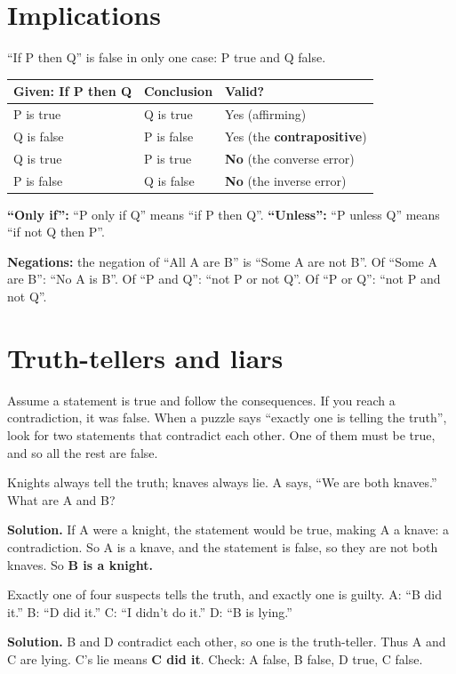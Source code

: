\documentclass[11pt,a4paper,openany]{report}
\begin{document}
\section{Implications}
``If P then Q'' is false in only one case: P true and Q false.
\begin{center}\small
\begin{tabular}{lll}
\toprule
Given: If P then Q & Conclusion & Valid?\\\midrule
P is true & Q is true & Yes (affirming)\\
Q is false & P is false & Yes (the \textbf{contrapositive})\\
Q is true & P is true & \textbf{No} (the converse error)\\
P is false & Q is false & \textbf{No} (the inverse error)\\
\bottomrule
\end{tabular}
\end{center}
\textbf{``Only if'':} ``P only if Q'' means ``if P then Q''. \textbf{``Unless'':} ``P unless Q'' means ``if not Q then P''.

\textbf{Negations:} the negation of ``All A are B'' is ``Some A are not B''. Of ``Some A are B'': ``No A is B''. Of ``P and Q'': ``not P or not Q''. Of ``P or Q'': ``not P and not Q''.

\section{Truth-tellers and liars}
\begin{idea}[Method]
Assume a statement is true and follow the consequences. If you reach a contradiction, it was false. When a puzzle says ``exactly one is telling the truth'', look for two statements that contradict each other. One of them must be true, and so all the rest are false.
\end{idea}

\begin{example}
Knights always tell the truth; knaves always lie. A says, ``We are both knaves.'' What are A and B?

\textbf{Solution.} If A were a knight, the statement would be true, making A a knave: a contradiction. So A is a knave, and the statement is false, so they are not both knaves. So \textbf{B is a knight.}
\end{example}

\begin{example}
Exactly one of four suspects tells the truth, and exactly one is guilty. A: ``B did it.'' B: ``D did it.'' C: ``I didn't do it.'' D: ``B is lying.''

\textbf{Solution.} B and D contradict each other, so one is the truth-teller. Thus A and C are lying. C's lie means \textbf{C did it}. Check: A false, B false, D true, C false. \checkmark
\end{example}
\end{document}
